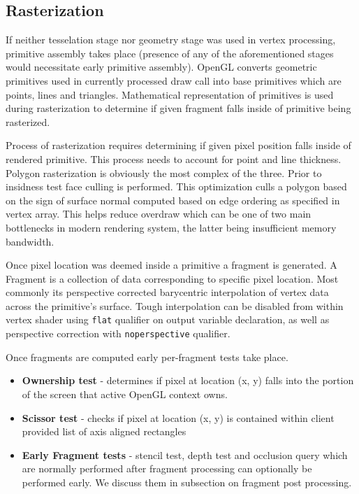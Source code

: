 \subsection{Rasterization}

If neither tesselation stage nor geometry stage was used in vertex processing, primitive assembly takes place (presence of any of the aforementioned stages would necessitate early primitive assembly). 
OpenGL converts geometric primitives used in currently processed draw call into base primitives which are points, lines and triangles.
Mathematical representation of primitives is used during rasterization to determine if given fragment falls inside of primitive being rasterized.

Process of rasterization requires determining if given pixel position falls inside of rendered primitive. This process needs to account for point and line thickness.
Polygon rasterization is obviously the most complex of the three. Prior to insidness test face culling is performed. 
This optimization culls a polygon based on the sign of surface normal computed based on edge ordering as specified in vertex array.
This helps reduce overdraw which can be one of two main bottlenecks in modern rendering system, the latter being insufficient memory bandwidth.

Once pixel location was deemed inside a primitive a fragment is generated. 
A Fragment is a collection of data corresponding to specific pixel location.
Most commonly its perspective corrected barycentric interpolation of vertex data across the primitive's surface.
Tough interpolation can be disabled from within vertex shader using \texttt{flat} qualifier on output variable declaration,
as well as perspective correction with \texttt{noperspective} qualifier.

Once fragments are computed early per-fragment tests take place.

\begin{itemize}
    \item \textbf{Ownership test} - determines if pixel at location (x, y) falls into the portion of the screen that active OpenGL context owns.
    \item \textbf{Scissor test} - checks if pixel at location (x, y) is contained within client provided list of axis aligned rectangles
    \item \textbf{Early Fragment tests} - stencil test, depth test and occlusion query which are normally performed after fragment processing can optionally be performed early. We discuss them in subsection on fragment post processing.
\end{itemize}


